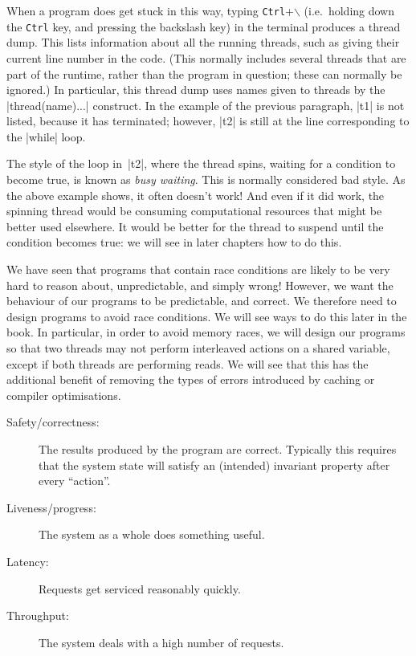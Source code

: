When a program does get stuck in this way, typing \texttt{Ctrl}+$\backslash$
(i.e.~holding down the \texttt{Ctrl} key, and pressing the backslash key) in
the terminal produces a thread dump.  This lists information about all the
running threads, such as giving their current line number in the code.  (This
normally includes several threads that are part of the runtime, rather than
the program in question; these can normally be ignored.)  In particular, this
thread dump uses names given to threads by the |thread(name){...}| construct.
In the example of the previous paragraph, |t1| is not listed, because it has
terminated; however, |t2| is still at the line corresponding to the |while|
loop.

The style of the loop in~|t2|, where the thread spins, waiting for a condition
to become true, is known as \emph{busy waiting}.  This is normally considered
bad style.  As the above example shows, it often doesn't work!  And even if it
did work, the spinning thread would be consuming computational resources that
might be better used elsewhere.  It would be better for the thread to suspend
until the condition becomes true: we will see in later chapters how to do
this.  

We have seen that programs that contain race conditions are likely to be very
hard to reason about, unpredictable, and simply wrong!  However, we want the
behaviour of our programs to be predictable, and correct.  We therefore need
to design programs to avoid race conditions.  We will see ways to do this
later in the book.  In particular, in order to avoid memory races, we will
design our programs so that two threads may not perform interleaved actions on
a shared variable, except if both threads are performing reads.  We will see
that this has the additional benefit of removing the types of errors
introduced by caching or compiler optimisations.




\begin{description}
\item[Safety/correctness:] The results produced by the program are correct.
  Typically this requires that the system state will satisfy an (intended)
  invariant property after every ``action''.

\item[Liveness/progress:] The system as a whole does something useful.
\end{description}

\bigskip


\begin{description}
\item[Latency:]
Requests get serviced reasonably quickly.

\item[Throughput:]
The system deals with a high number of requests.
\end{description}
